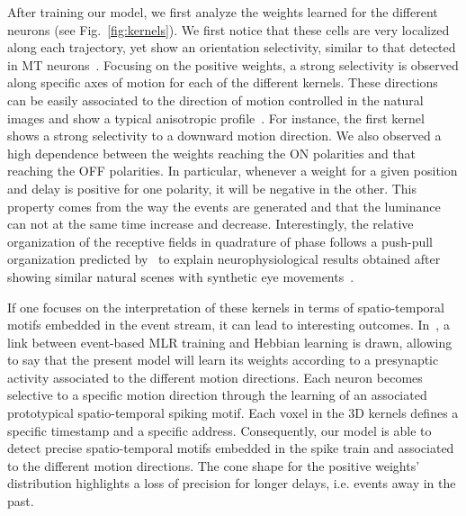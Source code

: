 \documentclass[default]{sn-jnl}%
\theoremstyle{thmstyleone}%
\theoremstyle{thmstyletwo}%
\theoremstyle{thmstylethree}%
\newcommand{\seeFig}[1]{see Fig.~\ref{fig:#1}}%
\begin{document}
%
%
After training our model, we first analyze the weights learned for the different neurons (\seeFig{kernels}). We first notice that these cells are very localized along each trajectory, yet show an orientation selectivity, similar to that detected in MT neurons~\citep{deangelis_functional_1999}. Focusing on the positive weights, a strong selectivity is observed along specific axes of motion for each of the different kernels. These directions can be easily associated to the direction of motion controlled in the natural images and show a typical anisotropic profile~\citep{kaplan_anisotropic_2013}. For instance, the first kernel shows a strong selectivity to a downward motion direction.
We also observed a high dependence between the weights reaching the ON polarities and that reaching the OFF polarities. In particular, whenever a weight for a given position and delay is positive for one polarity, it will be negative in the other. This property comes from the way the events are generated and that the luminance can not at the same time increase and decrease.  Interestingly, the relative organization of the receptive fields in quadrature of phase follows a push-pull organization predicted by~\citet{kremkow_push-pull_2016} to explain neurophysiological results obtained after showing similar natural scenes with synthetic eye movements~\citep{baudot_animation_2013}. %
%

If one focuses on the interpretation of these kernels in terms of spatio-temporal motifs embedded in the event stream, it can lead to interesting outcomes. In~\citep{grimaldi_robust_2022}, a link between event-based MLR training and Hebbian learning is drawn, allowing to say that the present model will learn its weights according to a presynaptic activity associated to the different motion directions. Each neuron becomes selective to a specific motion direction through the learning of an associated prototypical spatio-temporal spiking motif. Each voxel in the 3D kernels defines a specific timestamp and a specific address. Consequently, our model is able to detect precise spatio-temporal motifs embedded in the spike train and associated to the different motion directions. The cone shape for the positive weights' distribution highlights a loss of precision for longer delays, i.e. events away in the past. %
\end{document}
